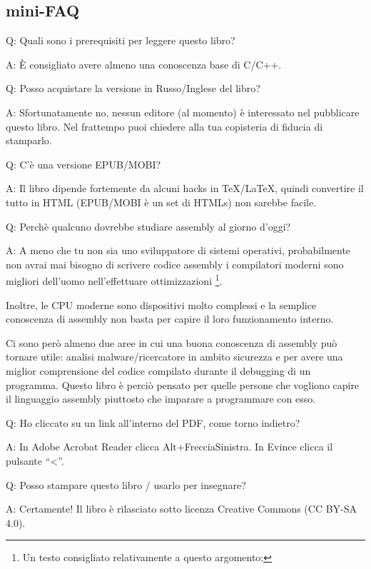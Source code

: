 \subsection*{mini-FAQ}

\par Q: Quali sono i prerequisiti per leggere questo libro?
\par A: È consigliato avere almeno una conoscenza base di C/C++.
\par Q: Posso acquistare la versione in Russo/Inglese del libro?
\par A: Sfortunatamente no, nessun editore (al momento) è interessato nel pubblicare questo libro.
Nel frattempo puoi chiedere alla tua copisteria di fiducia di stamparlo.

\par Q: C'è una versione EPUB/MOBI?
\par A: Il libro dipende fortemente da alcuni hacks in TeX/LaTeX, quindi convertire il tutto in HTML (EPUB/MOBI è un set di HTMLs)
non sarebbe facile.

\par Q: Perchè qualcuno dovrebbe studiare assembly al giorno d'oggi?
\par A: A meno che tu non sia uno sviluppatore di \ac{sistemi operativi}, probabilmente non avrai mai bisogno di scrivere codice assembly \textemdash{}i compilatori moderni sono migliori dell'uomo nell'effettuare ottimizzazioni \footnote{Un testo consigliato relativamente a questo argomento: \InSqBrackets{\AgnerFog}}.

Inoltre, le \ac{CPU} moderne sono dispositivi molto complessi e la semplice conoscenza di assembly non basta per capire il loro funzionamento interno.

Ci sono però almeno due aree in cui una buona conoscenza di assembly può tornare utile: analisi malware/ricercatore in ambito sicurezza e per avere una miglior comprensione del codice compilato durante il debugging di un programma. 
Questo libro è perciò pensato per quelle persone che vogliono capire il linguaggio assembly piuttosto che imparare a programmare con esso.

\par Q: Ho cliccato su un link all'interno del PDF, come torno indietro?
\par A: In Adobe Acrobat Reader clicca Alt+FrecciaSinistra. In Evince clicca il pulsante ``<''.

\par Q: Posso stampare questo libro / usarlo per insegnare?
\par A: Certamente! Il libro è rilasciato sotto licenza Creative Commons (CC BY-SA 4.0).

